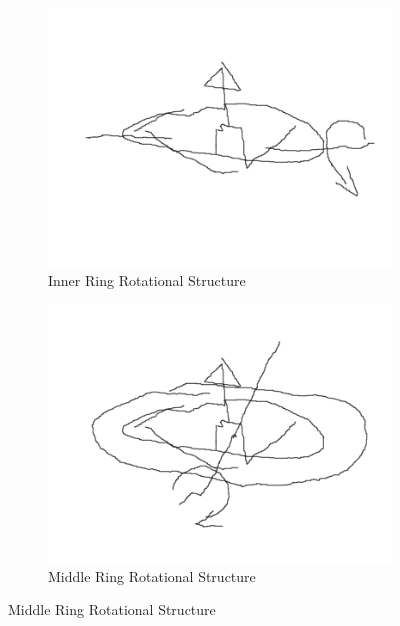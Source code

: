 \begin{figure}[htbp]
\centering
\begin{subfigure}{0.49\textwidth}
\includegraphics[width=\textwidth]{figs/inertia-inner}
\caption{Inner Ring Rotational Structure}
\label{fig:inertia-inner}
\end{subfigure}
\begin{subfigure}{0.49\textwidth}
\includegraphics[width=\textwidth]{figs/inertia-middle}
\caption{Middle Ring Rotational Structure}
\label{fig:inertia-middle}
\end{subfigure}
\end{figure}
\par

